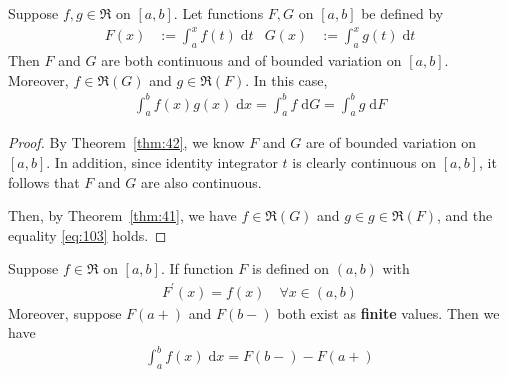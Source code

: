 \documentclass[thmcnt=section, 12pt]{elegantbook}
\begin{document}

\begin{theorem} \label{thm:43}
    Suppose $f, g \in \mathfrak{R}$ on $[a, b]$. Let functions $F, G$ on $[a, b]$ be defined by
    \begin{align*}
        F(x) &:= \int_a^x f(t) \; \mathrm{d}t & 
        G(x) &:= \int_a^x g(t) \; \mathrm{d}t
    \end{align*}
    Then $F$ and $G$ are both continuous and of bounded variation on $[a, b]$. Moreover, $f \in \mathfrak{R}(G)$ and $g \in \mathfrak{R}(F)$. In this case, 
    \begin{align}
        \int_a^b f(x) g(x) \; \mathrm{d}x
        = \int_a^b f \; \mathrm{d}G
        = \int_a^b g \; \mathrm{d}F
        \label{eq:103}
    \end{align}
\end{theorem}

\begin{proof}
    By Theorem~\ref{thm:42}, we know $F$ and $G$ are of bounded variation on $[a, b]$. In addition, since identity integrator $t$ is clearly continuous on $[a, b]$, it follows that $F$ and $G$ are also continuous. 

    \par Then, by Theorem~\ref{thm:41}, we have $f \in \mathfrak{R}(G)$ and $g \in g \in \mathfrak{R}(F)$, and the equality \eqref{eq:103} holds.
\end{proof}


\begin{theorem} \label{thm:45}
    Suppose $f \in \mathfrak{R}$ on $[a, b]$. If function $F$ is defined on $(a, b)$ with 
    \begin{align*}
        F^\prime(x) = f(x)
        \quad \forall x \in (a, b)
    \end{align*}
    Moreover, suppose $F(a+)$ and $F(b-)$ both exist as \textbf{finite} values. Then we have 
    \begin{align}
        \int_a^b f(x) \; \mathrm{d}x
        = F(b-) - F(a+)
        \label{eq:106}
    \end{align}
\end{theorem}
\end{document}
